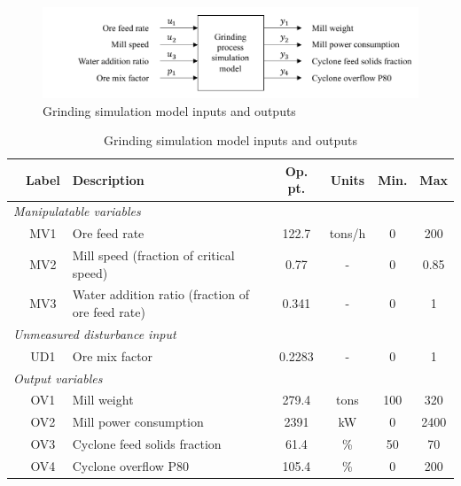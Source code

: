{\begin{figure}[htp]
	\centering
	\includegraphics[width=15cm]{images/grind_sim_io_diag.pdf}
	\caption{Grinding simulation model inputs and outputs}
	\label{fig:grind_sim_io_diag}
\end{figure}

\begin{table}[h!]
	\centering
	\caption{Grinding simulation model inputs and outputs} \label{tb:grind-vars}
	\begin{tabular}{c c >{\raggedright}p{5.5cm} c c c c}
		& Label & Description & Op. pt. & Units & Min. & Max \\
		\midrule
		\multicolumn{7}{l}{\textit{Manipulatable variables}} \\
		  & MV1       & Ore feed rate & 122.7 & tons/h & 0 & 200 \\   
		  & MV2       & Mill speed (fraction of critical speed) & 0.77 & - & 0 & 0.85 \\ 
		  & MV3       & Water addition ratio (fraction of ore feed rate) & 0.341 & - & 0 & 1 \\ 
		\multicolumn{7}{l}{\textit{Unmeasured disturbance input}} \\
		  & UD1        & Ore mix factor & 0.2283 & - & 0 & 1  \\ 
		\multicolumn{7}{l}{\textit{Output variables}} \\
		  & OV1        & Mill weight & 279.4 & tons & 100 & 320  \\ 
		  & OV2       & Mill power consumption & 2391 & kW & 0 & 2400  \\ 
		  & OV3       & Cyclone feed solids fraction & 61.4 & \% & 50 & 70  \\ 
		  & OV4       & Cyclone overflow P80 & 105.4 & \% & 0 & 200  \\ 
		\bottomrule
	\end{tabular}
\end{table}

}
